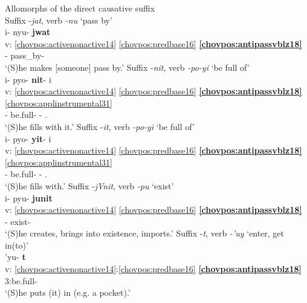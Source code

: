 \documentclass[output=paper]{langscibook}
\begin{document}

\ea\label{bkm:Ref88868117}Allomorphs of the direct causative suffix\\
    \ea  Suffix -\textit{jat}, verb \textit{-nu} `pass by'\\ {
    \glll {} i- nyu- \textbf{jwat}\\
    v: \ref{chovpos:activenonactive14} \ref{chovpos:predbase16} \textbf{\ref{chovpos:antipassvblz18}} \\ 
    {} \Third{}- pass\_by- \textbf{\Caus{}}\\
    \glt `(S)he makes [someone] pass by.' 
    }
    \ex\label{bkm:Ref89006803} Suffix -\textit{nit}, verb \textit{-po-yi} `be full of'\\ {
    \glll {} i- pyo- \textbf{nit}{}- i\\ 
    v: \ref{chovpos:activenonactive14} \ref{chovpos:predbase16} \textbf{\ref{chovpos:antipassvblz18}} \ref{chovpos:applinstrumental31}\\ 
    {} \Third{}- be.full- \textbf{\Caus{}}- \Ap.\Ins{}\\
    \glt `(S)he fills with it.'
    }
    \ex\label{bkm:Ref89006805} Suffix -\textit{it}, verb \textit{-po-yi} `be full of'\\ {
    \glll {} i- pyo- \textbf{yit}{}- i\\
    v: \ref{chovpos:activenonactive14} \ref{chovpos:predbase16} \textbf{\ref{chovpos:antipassvblz18}} \ref{chovpos:applinstrumental31}\\ 
    {} \Third{}- be.full- \textbf{\Caus{}}- \Ap.\Ins{}\\
    \glt `(S)he fills with.'
    }
    \ex  Suffix -\textit{jVnit}, verb \textit{-pu} `exist'\\ {
    \glll {} i- pyu- \textbf{junit}\\
    v: \ref{chovpos:activenonactive14} \ref{chovpos:predbase16} \textbf{\ref{chovpos:antipassvblz18}}\\
    {} \Third{}- exist- \textbf{\Caus{}}\\
    \glt `(S)he creates, brings into existence, imports.'
    }
    \ex  Suffix -\textit{t}, verb \textit{-'uy} `enter, get in(to)'\\ {
    \glll {} 'yu- \textbf{t}\\ 
    v: \ref{chovpos:activenonactive14}:\ref{chovpos:predbase16} \textbf{\ref{chovpos:antipassvblz18}}\\ 
    {} 3:be.full- \textbf{\Caus{}}\\
    \glt `(S)he puts (it) in (e.g. a pocket).'
    }
    \z 
\z 
\end{document}
